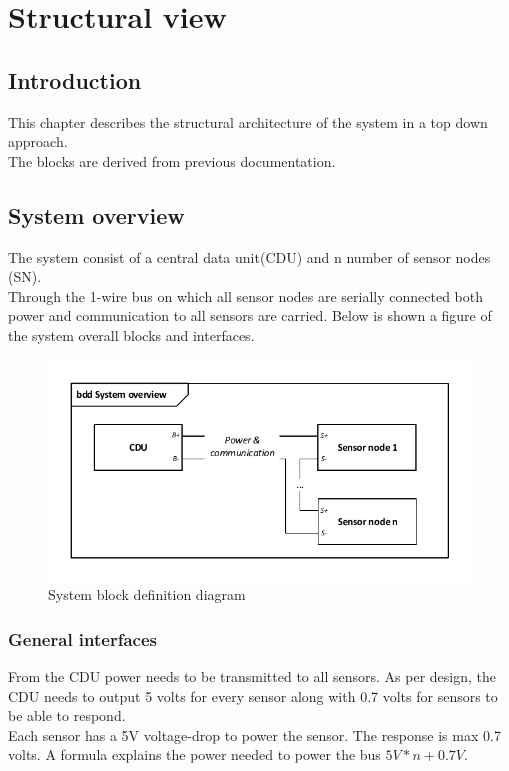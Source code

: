 \chapter{Structural view}

\section{Introduction}
This chapter describes the structural architecture of the system in a top down approach.\\
The blocks are derived from previous documentation.


\section{System overview}
The system consist of a central data unit(CDU) and n number of sensor nodes (SN).\\
Through the 1-wire bus on which all sensor nodes are serially connected both power and communication to all sensors are carried. Below is shown a figure of the system overall blocks and interfaces.
\begin{figure}[hbpt]
\centering
\includegraphics[width=.9\textwidth]{billeder/systembdd}
\caption{System block definition diagram}
\label{systembdd}
\end{figure}

\subsection{General interfaces}
From the CDU power needs to be transmitted to all sensors. As per design, the CDU needs to output 5 volts for every sensor along with 0.7 volts for sensors to be able to respond.\\
Each sensor has a 5V voltage-drop to power the sensor. The response is max 0.7 volts. A formula explains the power needed to power the bus $5V * n + 0.7V$.

